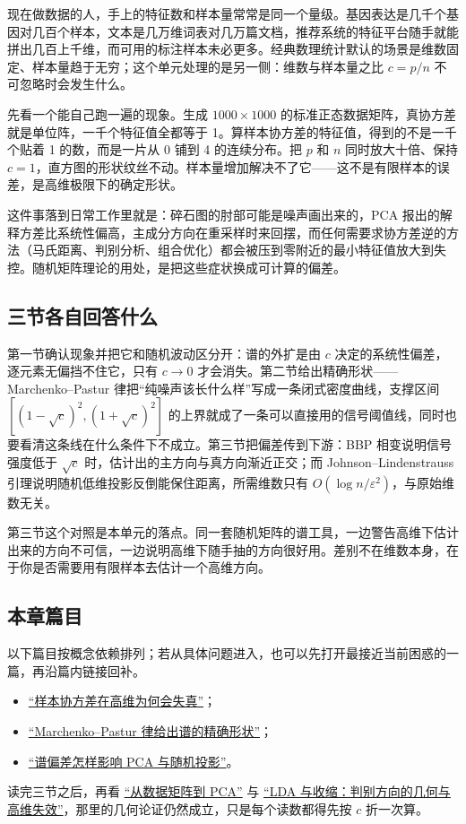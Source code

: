 现在做数据的人，手上的特征数和样本量常常是同一个量级。基因表达是几千个基因对几百个样本，文本是几万维词表对几万篇文档，推荐系统的特征平台随手就能拼出几百上千维，而可用的标注样本未必更多。经典数理统计默认的场景是维数固定、样本量趋于无穷；这个单元处理的是另一侧：维数与样本量之比 \(c=p/n\) 不可忽略时会发生什么。

先看一个能自己跑一遍的现象。生成 \(1000\times1000\) 的标准正态数据矩阵，真协方差就是单位阵，一千个特征值全都等于 1。算样本协方差的特征值，得到的不是一千个贴着 1 的数，而是一片从 0 铺到 4 的连续分布。把 \(p\) 和 \(n\) 同时放大十倍、保持 \(c=1\)，直方图的形状纹丝不动。样本量增加解决不了它——这不是有限样本的误差，是高维极限下的确定形状。

这件事落到日常工作里就是：碎石图的肘部可能是噪声画出来的，PCA 报出的解释方差比系统性偏高，主成分方向在重采样时来回摆，而任何需要求协方差逆的方法（马氏距离、判别分析、组合优化）都会被压到零附近的最小特征值放大到失控。随机矩阵理论的用处，是把这些症状换成可计算的偏差。

\subsection{三节各自回答什么}

第一节确认现象并把它和随机波动区分开：谱的外扩是由 \(c\) 决定的系统性偏差，逐元素无偏挡不住它，只有 \(c\to0\) 才会消失。第二节给出精确形状——Marchenko--Pastur 律把``纯噪声该长什么样''写成一条闭式密度曲线，支撑区间 \([(1-\sqrt c)^2,(1+\sqrt c)^2]\) 的上界就成了一条可以直接用的信号阈值线，同时也要看清这条线在什么条件下不成立。第三节把偏差传到下游：BBP 相变说明信号强度低于 \(\sqrt c\) 时，估计出的主方向与真方向渐近正交；而 Johnson--Lindenstrauss 引理说明随机低维投影反倒能保住距离，所需维数只有 \(O(\log n/\varepsilon^2)\)，与原始维数无关。

第三节这个对照是本单元的落点。同一套随机矩阵的谱工具，一边警告高维下估计出来的方向不可信，一边说明高维下随手抽的方向很好用。差别不在维数本身，在于你是否需要用有限样本去估计一个高维方向。

\subsection{本章篇目}

以下篇目按概念依赖排列；若从具体问题进入，也可以先打开最接近当前困惑的一篇，再沿篇内链接回补。

\begin{itemize}
\tightlist
\item \hyperref[sec:11-Mathematical-Statistics/09-Random-Matrix-Theory/01]{``样本协方差在高维为何会失真''}；
\item \hyperref[sec:11-Mathematical-Statistics/09-Random-Matrix-Theory/02]{``Marchenko--Pastur 律给出谱的精确形状''}；
\item \hyperref[sec:11-Mathematical-Statistics/09-Random-Matrix-Theory/03]{``谱偏差怎样影响 PCA 与随机投影''}。
\end{itemize}

读完三节之后，再看 \hyperref[sec:03-Linear-Algebra/07-SVD-and-Data-Applications/04]{``从数据矩阵到 PCA''} 与 \hyperref[sec:13-Machine-Learning/06-Probabilistic-Models/02]{``LDA 与收缩：判别方向的几何与高维失效''}，那里的几何论证仍然成立，只是每个读数都得先按 \(c\) 折一次算。
